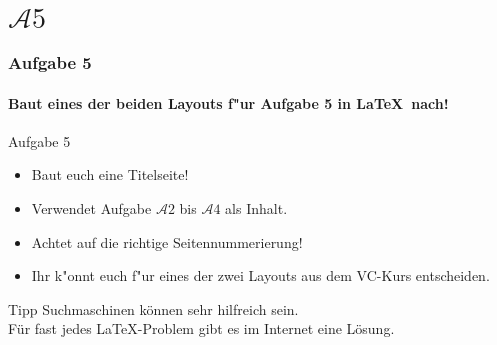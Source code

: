 \section{$\mathcal{A}5$}

\begin{frame}
\frametitle{Aufgabe 5}
\framesubtitle{Baut eines der beiden Layouts f"ur Aufgabe 5 in \LaTeX ~nach!}

\begin{block}{Aufgabe 5}
\begin{itemize}
\item Baut euch eine Titelseite!%
\item Verwendet Aufgabe $\mathcal{A}2$ bis $\mathcal{A}4$ als Inhalt.%
\item Achtet auf die richtige Seitennummerierung!%
\item Ihr k"onnt euch f"ur eines der zwei Layouts aus dem VC-Kurs entscheiden.%
\end{itemize}
\end{block}

\begin{exampleblock}{Tipp}
Suchmaschinen können sehr hilfreich sein. \\ Für fast jedes \LaTeX-Problem gibt es im Internet eine Lösung.
\end{exampleblock}

\end{frame}